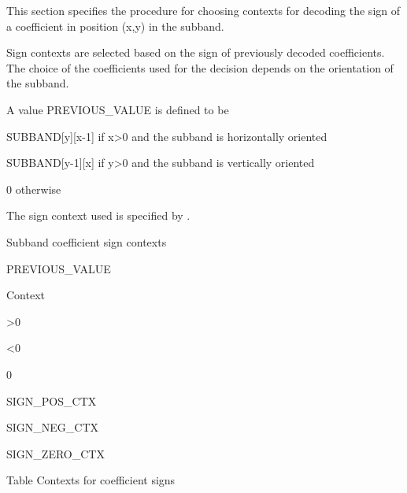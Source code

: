This section specifies the procedure for choosing contexts for decoding
the sign of a coefficient in position (x,y) in the subband. 

Sign contexts are selected based on the sign of previously decoded
coefficients. The choice of the coefficients used for the decision
depends on the orientation of the subband.

A value PREVIOUS\_VALUE is defined to be

    SUBBAND[y][x-1] if x>0 and the subband is horizontally oriented

    SUBBAND[y-1][x] if y>0 and the subband is vertically oriented

    0 otherwise

The sign context used is specified by .


Subband coefficient sign contexts

PREVIOUS\_VALUE

Context

>0

<0

0

SIGN\_POS\_CTX

SIGN\_NEG\_CTX

SIGN\_ZERO\_CTX


Table   Contexts for coefficient signs



